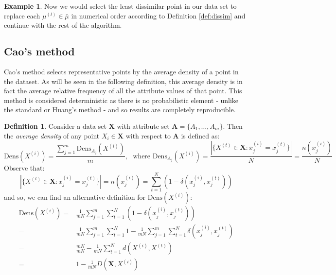 \documentclass{article}
\theoremstyle{definition}
\newtheorem{definition}{Definition}[section]
\newtheorem{example}{Example}
\begin{document}
\begin{example}
	Now we would select the least dissimilar point in our data set to replace each $\mu^{(l)} \in \bar{\mu}$ in numerical order according to Definition \ref{def:dissim} and continue with the rest of the algorithm. \\
\end{example}


\subsection{Cao's method}\label{subsection:cao}

Cao's method selects representative points by the average density of a point in
the dataset. As will be seen in the following definition, this average density 
is in fact the average relative frequency of all the attribute values of that 
point. This method is considered deterministic as there is no probabilistic 
element - unlike the standard or Huang's method - and so results are completely
reproducible.


\begin{definition}\label{def:density}	
	Consider a data set $\textbf{X}$ with attribute set $\textbf{A} = 
	\{A_1, \ldots, A_m\}$. Then the \emph{average density} of any point 
	$X_i \in \textbf{X}$ with respect to $\textbf{A}$ is defined 
	\cite{Cao09} as:
	\[
	\text{Dens}(X^{(i)}) = \frac{\sum_{j=1}^m 
		\text{Dens}_{A_j}(X^{(i)})}{m}, \ \ \ 
		\text{where \ Dens}_{A_j}(X^{(i)}) = 
		\frac{|\{X^{(t)} \in \textbf{X} : x_j^{(i)} = x_j^{(t)}\}|}{N} = 
		\frac{n(x_j^{(i)})}{N}
	\]
	Observe that:
	\[
	|\{X^{(t)} \in \textbf{X} : x_j^{(i)} = x_j^{(t)}\}| = n(x_j^{(i)}) = 
		\sum_{t=1}^N (1 - \delta(x_j^{(i)}, x_j^{(t)}))
	\]	
	and so, we can find an alternative definition for 
	$\text{Dens}(X^{(i)})$:
	\begin{equation}
	\begin{aligned}
	\text{Dens}(X^{(i)}) = {} & {} \frac{1}{mN} \sum_{j=1}^m 
					\sum_{t=1}^N (1 - \delta(x_j^{(i)},
					x_j^{(t)})) \\
			     = {} & {} \frac{1}{mN} \sum_{j=1}^m \sum_{t=1}^N 
			     		1 - \frac{1}{mN} \sum_{j=1}^m 
					\sum_{t=1}^N \delta(x_j^{(i)}, 
					x_j^{(t)}) \\
      			     = {} & {} \frac{mN}{mN} - \frac{1}{mN} \sum_{t=1}^N
			     		d(X^{(i)}, X^{(t)}) \\
			     = {} & {} 1 - \frac{1}{mN} D(\textbf{X}, X^{(i)})
	\end{aligned}
	\end{equation}
\end{definition}	
\end{document}
